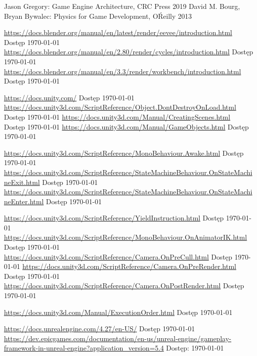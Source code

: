 \documentclass[12pt,twoside]{article}
\begin{document}
\begin{thebibliography}{4}
 Jason Gregory: Game Engine Architecture, CRC Press 2019
 David M. Bourg, Bryan Bywalec: Physics for Game Development, O\'Reilly 2013

 \url{https://docs.blender.org/manual/en/latest/render/eevee/introduction.html} Dostęp \today
{} \url{https://docs.blender.org/manual/en/2.80/render/cycles/introduction.html} Dostęp \today
{} \url{https://docs.blender.org/manual/en/3.3/render/workbench/introduction.html} Dostęp \today



 \url{https://docs.unity.com/} Dostęp \today
{} \url{https://docs.unity3d.com/ScriptReference/Object.DontDestroyOnLoad.html} Dostęp \today
{} \url{https://docs.unity3d.com/Manual/CreatingScenes.html} Dostęp \today
{} \url{https://docs.unity3d.com/Manual/GameObjects.html} Dostęp \today

 \url{https://docs.unity3d.com/ScriptReference/MonoBehaviour.Awake.html} Dostęp \today
{} \url{https://docs.unity3d.com/ScriptReference/StateMachineBehaviour.OnStateMachineExit.html} Dostęp \today
{} \url{https://docs.unity3d.com/ScriptReference/StateMachineBehaviour.OnStateMachineEnter.html} Dostęp \today

 \url{https://docs.unity3d.com/ScriptReference/YieldInstruction.html} Dostęp \today
{} \url{https://docs.unity3d.com/ScriptReference/MonoBehaviour.OnAnimatorIK.html} Dostęp \today
{} \url{https://docs.unity3d.com/ScriptReference/Camera.OnPreCull.html} Dostęp \today
{} \url{https://docs.unity3d.com/ScriptReference/Camera.OnPreRender.html} Dostęp \today
{} \url{https://docs.unity3d.com/ScriptReference/Camera.OnPostRender.html} Dostęp \today

 \url{https://docs.unity3d.com/Manual/ExecutionOrder.html} Dostęp \today

 \url{https://docs.unrealengine.com/4.27/en-US/} Dostęp \today
{} \url{https://dev.epicgames.com/documentation/en-us/unreal-engine/gameplay-framework-in-unreal-engine?application_version=5.4} Dostęp: \today


\end{thebibliography}
\end{document}
